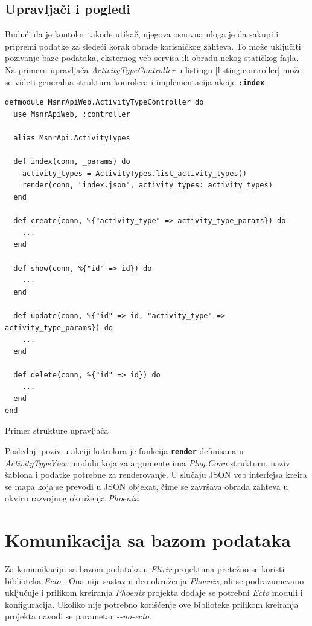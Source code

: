 \documentclass[12pt,oneside]{memoir}
\begin{document}
\subsection{Upravljači i pogledi}
Budući da je kontolor takođe utikač, njegova osnovna uloga je da sakupi i pripremi podatke za sledeći korak obrade korisničkog zahteva.
To može uključiti pozivanje baze podataka, eksternog veb servisa ili obradu nekog statičkog fajla. 
Na primeru upravljača \emph{ActivityTypeController} u listingu \ref{listing:controller} može se videti generalna struktura konrolera
i implementacija akcije \texttt{\textbf{:index}}.
\begin{listing}[!h]
\begin{verbatim}
defmodule MsnrApiWeb.ActivityTypeController do
  use MsnrApiWeb, :controller

  alias MsnrApi.ActivityTypes

  def index(conn, _params) do
    activity_types = ActivityTypes.list_activity_types()
    render(conn, "index.json", activity_types: activity_types)
  end

  def create(conn, %{"activity_type" => activity_type_params}) do
    ...
  end

  def show(conn, %{"id" => id}) do
    ...
  end

  def update(conn, %{"id" => id, "activity_type" => activity_type_params}) do
    ...
  end

  def delete(conn, %{"id" => id}) do
    ...
  end
end
\end{verbatim}
\caption{Primer strukture upravljača}
\label{listing:controller}
\end{listing}

Poslednji poziv u akciji kotrolora je funkcija \texttt{\textbf{render}} definisana u \emph{ActivityTypeView} modulu koja za argumente ima \emph{Plug.Conn} strukturu,
naziv šablona i podatke potrebne za renderovanje. U slučaju JSON veb interfejsa kreira se mapa koja se prevodi u JSON objekat,
čime se završava obrada zahteva u okviru razvojnog okruženja \emph{Phoenix}. 

\section{Komunikacija sa bazom podataka}
Za komunikaciju sa bazom podataka u \emph{Elixir} projektima pretežno se koristi biblioteka \emph{Ecto} \cite{ecto}.
Ona nije sastavni deo okruženja \emph{Phoenix}, ali se podrazumevano uključuje i prilikom kreiranja
\emph{Phoenix} projekta dodaje se potrebni \emph{Ecto} moduli i konfiguracija. Ukoliko nije potrebno
korišćenje ove biblioteke prilikom kreiranja projekta navodi se parametar \emph{-{}-no-ecto}.
\end{document}
